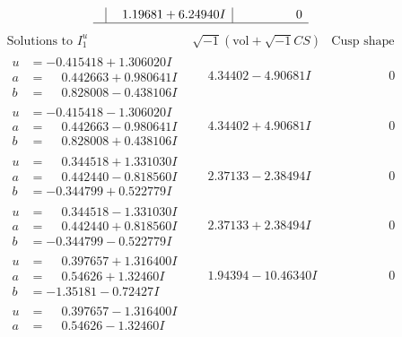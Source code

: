 \documentclass[1p]{elsarticle_modified}
\theoremstyle{definition}
\newcommand{\I}{\sqrt{-1}}
\begin{document}
$$\begin{array}{c|c|c}
 & \phantom{-}1.19681 + 6.24940 I & \phantom{-0.000000 } 0\\
 \hline 
 \end{array}$$\newpage$$\begin{array}{c|c|c}  
\text{Solutions to }I^u_{1}& \I (\text{vol} + \sqrt{-1}CS) & \text{Cusp shape}\\
 \hline 
\begin{aligned}
u &= -0.415418 + 1.306020 I \\
a &= \phantom{-}0.442663 + 0.980641 I \\
b &= \phantom{-}0.828008 - 0.438106 I\end{aligned}
 & \phantom{-}4.34402 - 4.90681 I & \phantom{-0.000000 } 0 \\ \hline\begin{aligned}
u &= -0.415418 - 1.306020 I \\
a &= \phantom{-}0.442663 - 0.980641 I \\
b &= \phantom{-}0.828008 + 0.438106 I\end{aligned}
 & \phantom{-}4.34402 + 4.90681 I & \phantom{-0.000000 } 0 \\ \hline\begin{aligned}
u &= \phantom{-}0.344518 + 1.331030 I \\
a &= \phantom{-}0.442440 - 0.818560 I \\
b &= -0.344799 + 0.522779 I\end{aligned}
 & \phantom{-}2.37133 - 2.38494 I & \phantom{-0.000000 } 0 \\ \hline\begin{aligned}
u &= \phantom{-}0.344518 - 1.331030 I \\
a &= \phantom{-}0.442440 + 0.818560 I \\
b &= -0.344799 - 0.522779 I\end{aligned}
 & \phantom{-}2.37133 + 2.38494 I & \phantom{-0.000000 } 0 \\ \hline\begin{aligned}
u &= \phantom{-}0.397657 + 1.316400 I \\
a &= \phantom{-}0.54626 + 1.32460 I \\
b &= -1.35181 - 0.72427 I\end{aligned}
 & \phantom{-}1.94394 - 10.46340 I & \phantom{-0.000000 } 0 \\ \hline\begin{aligned}
u &= \phantom{-}0.397657 - 1.316400 I \\
a &= \phantom{-}0.54626 - 1.32460 I \\

\end{aligned}
\end{array}$$
\end{document}
